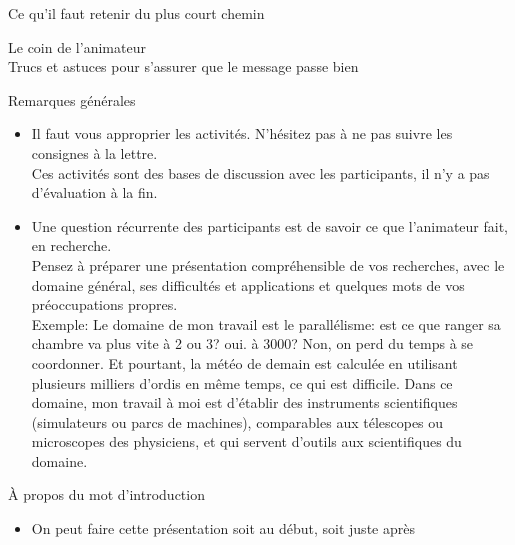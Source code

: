 \documentclass[final,hyperref={pdfpagelabels=false}]{beamer}
\renewcommand*{\footnotesize}{\fontsize{\resultfootnotesizeX}{\resultfootnotesizeY}\selectfont}
\renewcommand*{\large}{\fontsize{\resultlargeX}{\resultlargeY}\selectfont}
\begin{document}
\begin{frame}{Ce qu'il faut retenir du plus court chemin}

\end{frame}
\begin{frame}{Le coin de l'animateur\\[-5pt]
\label{coin::animateur}
  {\large Trucs et astuces pour s'assurer que le message passe bien}}
  \begin{block}{Remarques générales}
    \begin{itemize}
    \item Il faut vous approprier les activités. N'hésitez pas à ne pas suivre
      les consignes à la lettre.\\
      Ces activités sont des bases de discussion avec les participants, il n'y
      a pas d'évaluation à la fin.
    \item Une question récurrente des participants est de savoir ce que
      l'animateur fait, en recherche.\\
      Pensez à préparer une présentation compréhensible de vos recherches, avec
      le domaine général, ses difficultés et applications et quelques mots de
      vos préoccupations propres.\\
      {\footnotesize Exemple: Le domaine de mon travail est le parallélisme:
        est ce que ranger sa chambre va plus vite à 2 ou 3? oui. à 3000? Non,
        on perd du temps à se coordonner. Et pourtant, la météo de demain est
        calculée en utilisant plusieurs milliers d'ordis en même temps, ce qui
        est difficile. Dans ce domaine, mon travail à moi est d'établir des
        instruments scientifiques (simulateurs ou parcs de machines),
        comparables aux télescopes ou microscopes des physiciens, et qui
        servent d'outils aux scientifiques du domaine.}
    \end{itemize}
  \end{block}
  \begin{block}{À propos du mot d'introduction}
    \begin{itemize}
    \item On peut faire cette présentation soit au début, soit juste après

\end{itemize}
\end{block}
\end{frame}
\end{document}
